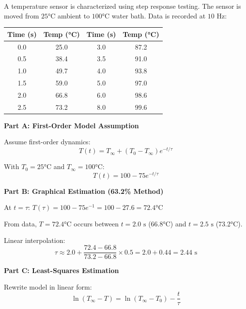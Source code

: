 \begin{example}

A temperature sensor is characterized using step response testing. The sensor is moved from $25°\text{C}$ ambient to $100°\text{C}$ water bath. Data is recorded at $10\text{ Hz}$:

\begin{center}
\begin{tabular}{cc|cc}
\toprule
Time (s) & Temp (°C) & Time (s) & Temp (°C) \\
\midrule
0.0 & 25.0 & 3.0 & 87.2 \\
0.5 & 38.4 & 3.5 & 91.0 \\
1.0 & 49.7 & 4.0 & 93.8 \\
1.5 & 59.0 & 5.0 & 97.0 \\
2.0 & 66.8 & 6.0 & 98.6 \\
2.5 & 73.2 & 8.0 & 99.6 \\
\bottomrule
\end{tabular}
\end{center}

\textbf{Part A: First-Order Model Assumption}

Assume first-order dynamics:
\begin{equation}
T(t) = T_{\infty} + (T_0 - T_{\infty})e^{-t/\tau}
\end{equation}

With $T_0 = 25°\text{C}$ and $T_{\infty} = 100°\text{C}$:
\begin{equation}
T(t) = 100 - 75e^{-t/\tau}
\end{equation}

\textbf{Part B: Graphical Estimation (63.2\% Method)}

At $t = \tau$: $T(\tau) = 100 - 75e^{-1} = 100 - 27.6 = 72.4°\text{C}$

From data, $T = 72.4°\text{C}$ occurs between $t = 2.0\text{ s}$ (66.8°C) and $t = 2.5\text{ s}$ (73.2°C).

Linear interpolation:
\begin{equation}
\tau \approx 2.0 + \frac{72.4 - 66.8}{73.2 - 66.8} \times 0.5 = 2.0 + 0.44 = 2.44\text{ s}
\end{equation}

\textbf{Part C: Least-Squares Estimation}

Rewrite model in linear form:
\begin{equation}
\ln(T_{\infty} - T) = \ln(T_{\infty} - T_0) - \frac{t}{\tau}
\end{equation}


\end{example}

